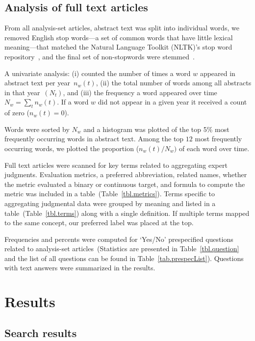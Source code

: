 \documentclass[preprint,authoryear]{elsarticle}
\begin{document}
\subsection{Analysis of full text articles}

From all analysis-set articles, abstract text was split into individual words, we removed English stop words---a set of common words that have little lexical meaning---that matched the Natural Language Toolkit (NLTK)'s stop word repository~\citep{loper2002nltk}, and the final set of non-stopwords were stemmed~\cite{willett2006porter}.

A univariate analysis: (i) counted the number of times a word $w$ appeared in abstract text per year~$n_{w}(t)$, (ii) the total number of words among all abstracts in that year~$(N_{t})$, and (iii) the frequency a word appeared over time $N_{w} = \sum_{t} n_{w}(t)$.
If a word $w$ did not appear in a given year it received a count of zero ($n_{w}(t)=0$).

Words were sorted by $N_{w}$ and a histogram was plotted of the top 5\% most frequently occurring words in abstract text.
Among the top $12$ most frequently occurring words, we plotted the proportion ($n_{w}(t)/N_{w})$ of each word over time.

Full text articles were scanned for key terms related to aggregating expert judgments.
Evaluation metrics, a preferred abbreviation, related names, whether the metric evaluated a binary or continuous target, and formula to compute the metric was included in a table~(Table~\ref{tbl.metrics}).  
Terms specific to aggregating judgmental data were grouped by meaning and listed in a table~(Table~\ref{tbl.terms}) along with a single definition.
If multiple terms mapped to the same concept, our preferred label was placed at the top. 

Frequencies and percents were computed for `Yes/No' prespecified questions related to analysis-set articles~(Statistics are presented in Table~\ref{tbl.question} and the list of all questions can be found in Table~\ref{tab.prespecList}).
Questions with text answers were summarized in the results. 

\section{Results}
\label{sec.results}

\subsection{Search results}
\end{document}
